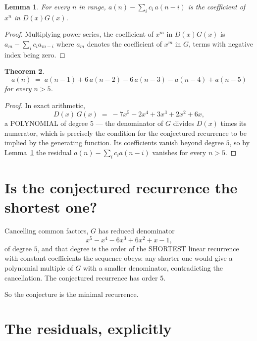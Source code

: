 \documentclass[11pt,a4paper]{article}
\theoremstyle{plain}
\newtheorem{theorem}{Theorem}
\newtheorem{lemma}[theorem]{Lemma}
\theoremstyle{definition}
\begin{document}
\begin{lemma}\label{lem:key}
For every $n$ in range, $a(n)-\sum_i c_i\,a(n-i)$ is the coefficient of $x^{n}$ in
$D(x)G(x)$.
\end{lemma}

\begin{proof}
Multiplying power series, the coefficient of $x^{m}$ in $D(x)G(x)$ is
$a_m-\sum_i c_i a_{m-i}$ where $a_m$ denotes the coefficient of $x^{m}$ in $G$, terms with
negative index being zero.
\end{proof}

\begin{theorem}
\[
a(n)\;=\;a(n-1) + 6\,a(n-2) - 6\,a(n-3) - a(n-4) + a(n-5)
\]
for every $n>5$.
\end{theorem}

\begin{proof}
In exact arithmetic,
\[
D(x)\,G(x)\;=\;- 7 x^{5} - 2 x^{4} + 3 x^{3} + 2 x^{2} + 6 x,
\]
a POLYNOMIAL of degree $5$ --- the denominator of $G$ divides $D(x)$ times its numerator,
which is precisely the condition for the conjectured recurrence to be implied by the
generating function. Its coefficients vanish beyond degree $5$, so by
Lemma~\ref{lem:key} the residual $a(n)-\sum_ic_ia(n-i)$ vanishes for every
$n>5$.
\end{proof}

\section{Is the conjectured recurrence the shortest one?}

Cancelling common factors, $G$ has reduced denominator
\[
x^{5} - x^{4} - 6 x^{3} + 6 x^{2} + x - 1,
\]
of degree $5$, and that degree is the order of the SHORTEST linear recurrence with
constant coefficients the sequence obeys: any shorter one would give a polynomial multiple of
$G$ with a smaller denominator, contradicting the cancellation. The conjectured recurrence has
order $5$.

So the conjecture is the minimal recurrence.

\section{The residuals, explicitly}
\end{document}
